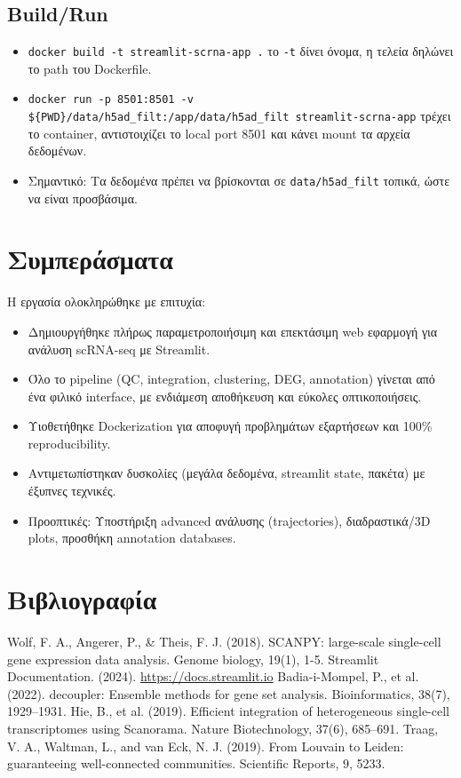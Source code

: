 \documentclass[12pt, a4paper]{article}
\begin{document}
\subsection{Build/Run}
\begin{itemize}
    \item \texttt{docker build -t streamlit-scrna-app .} το \texttt{-t} δίνει όνομα, η τελεία δηλώνει το path του Dockerfile.
    \item \texttt{docker run -p 8501:8501 -v \$\{PWD\}/data/h5ad\_filt:/app/data/h5ad\_filt streamlit-scrna-app} τρέχει το container, αντιστοιχίζει το local port 8501 και κάνει mount τα αρχεία δεδομένων.
    \item Σημαντικό: Τα δεδομένα πρέπει να βρίσκονται σε \texttt{data/h5ad\_filt} τοπικά, ώστε να είναι προσβάσιμα.
\end{itemize}

\section{Συμπεράσματα}
\label{sec:symperasmata}
Η εργασία ολοκληρώθηκε με επιτυχία:
\begin{itemize}
    \item Δημιουργήθηκε πλήρως παραμετροποιήσιμη και επεκτάσιμη web εφαρμογή για ανάλυση scRNA-seq με Streamlit.
    \item Όλο το pipeline (QC, integration, clustering, DEG, annotation) γίνεται από ένα φιλικό interface, με ενδιάμεση αποθήκευση και εύκολες οπτικοποιήσεις.
    \item Υιοθετήθηκε Dockerization για αποφυγή προβλημάτων εξαρτήσεων και 100\% reproducibility.
    \item Αντιμετωπίστηκαν δυσκολίες (μεγάλα δεδομένα, streamlit state, πακέτα) με έξυπνες τεχνικές.
    \item Προοπτικές: Υποστήριξη advanced ανάλυσης (trajectories), διαδραστικά/3D plots, προσθήκη annotation databases.
\end{itemize}

\section*{Βιβλιογραφία}
\begin{thebibliography}{99}
     Wolf, F. A., Angerer, P., \& Theis, F. J. (2018). SCANPY: large-scale single-cell gene expression data analysis. Genome biology, 19(1), 1-5.
     Streamlit Documentation. (2024). \url{https://docs.streamlit.io}
     Badia-i-Mompel, P., et al. (2022). decoupler: Ensemble methods for gene set analysis. Bioinformatics, 38(7), 1929–1931.
     Hie, B., et al. (2019). Efficient integration of heterogeneous single-cell transcriptomes using Scanorama. Nature Biotechnology, 37(6), 685–691.
     Traag, V. A., Waltman, L., and van Eck, N. J. (2019). From Louvain to Leiden: guaranteeing well-connected communities. Scientific Reports, 9, 5233.
\end{thebibliography}
\end{document}
